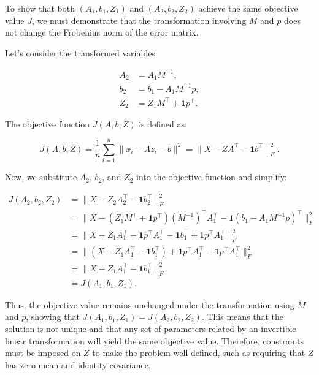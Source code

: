 \documentclass[a4paper]{article}
\theoremstyle{definition}
\newenvironment{soln}{
    \leavevmode\color{blue}\ignorespaces
}{}
\begin{document}
\begin{soln}
To show that both \((A_1, b_1, Z_1)\) and \((A_2, b_2, Z_2)\) achieve the same objective value \(J\), we must demonstrate that the transformation involving \(M\) and \(p\) does not change the Frobenius norm of the error matrix.
    
    Let's consider the transformed variables:
    
    \begin{align*}
    A_2 &= A_1M^{-1}, \\
    b_2 &= b_1 - A_1M^{-1}p, \\
    Z_2 &= Z_1 M^\top + \mathbf{1} p^\top.
    \end{align*}
    
    The objective function \(J(A, b, Z)\) is defined as:
    
    \[
    J(A, b, Z) = \frac{1}{n} \sum_{i=1}^n \|x_i - A z_i - b\|^2 = \| X - Z A^\top - \mathbf{1} b^\top \|_F^2.
    \]
    
    Now, we substitute \(A_2\), \(b_2\), and \(Z_2\) into the objective function and simplify:
        
    \begin{align*}
    J(A_2, b_2, Z_2) &= \| X - Z_2A_2^\top - \mathbf{1} b_2^\top\|_F^2 \\
    &= \| X - (Z_1 M^\top + \mathbf{1} p^\top)(M^{-1})^\top A_1^\top - \mathbf{1} (b_1 - A_1M^{-1}p)^\top\|_F^2 \\
    &= \| X - Z_1 A_1^\top - \mathbf{1} p^\top A_1^\top - \mathbf{1} b_1^\top + \mathbf{1} p^\top A_1^\top \|_F^2 \\
    &= \| (X - Z_1 A_1^\top - \mathbf{1} b_1^\top) + \mathbf{1} p^\top A_1^\top - \mathbf{1} p^\top A_1^\top \|_F^2 \\
    &= \| X - Z_1 A_1^\top - \mathbf{1} b_1^\top \|_F^2 \\
    &= J(A_1, b_1, Z_1).
    \end{align*}
    
    Thus, the objective value remains unchanged under the transformation using \(M\) and \(p\), showing that \(J(A_1, b_1, Z_1) = J(A_2, b_2, Z_2)\). This means that the solution is not unique and that any set of parameters related by an invertible linear transformation will yield the same objective value. Therefore, constraints must be imposed on \(Z\) to make the problem well-defined, such as requiring that \(Z\) has zero mean and identity covariance.
\end{soln}
\end{document}
